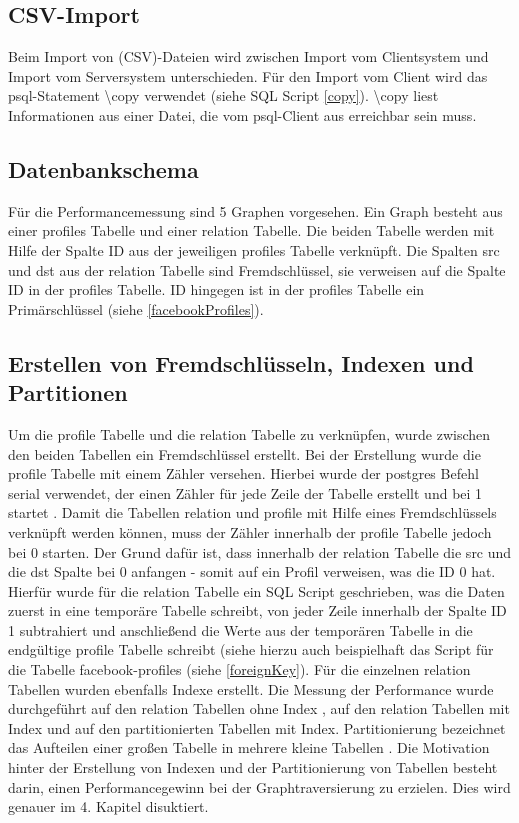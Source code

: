\subsection{CSV-Import}
Beim Import von (CSV)-Dateien wird zwischen Import vom Clientsystem und  Import vom Serversystem unterschieden.
Für den Import vom Client wird das psql-Statement \textbackslash copy verwendet (siehe SQL Script \ref{copy}).
\textbackslash copy liest Informationen aus einer Datei,
die vom psql-Client aus erreichbar sein muss. \cite{postgres2018}

\subsection{Datenbankschema}
Für die Performancemessung sind 5 Graphen vorgesehen. Ein Graph besteht aus einer profiles Tabelle und einer relation Tabelle. Die beiden Tabelle werden mit Hilfe der
Spalte ID aus der jeweiligen profiles Tabelle verknüpft. Die Spalten src und dst aus der relation Tabelle sind Fremdschlüssel, sie verweisen auf die Spalte ID in der
profiles Tabelle. ID hingegen ist in der profiles Tabelle ein Primärschlüssel (siehe \ref{facebookProfiles}).

\subsection{Erstellen von Fremdschlüsseln, Indexen und Partitionen}
Um die profile Tabelle und die relation Tabelle zu verknüpfen, wurde zwischen den beiden Tabellen ein Fremdschlüssel erstellt. Bei der Erstellung wurde die profile Tabelle
mit einem Zähler versehen. Hierbei wurde der postgres Befehl serial verwendet, der einen Zähler für jede Zeile der Tabelle erstellt und bei 1 startet . Damit die Tabellen
relation und profile mit Hilfe eines Fremdschlüssels verknüpft werden können, muss der Zähler innerhalb der profile Tabelle jedoch bei 0 starten. Der Grund dafür ist, dass
innerhalb der relation Tabelle die src und die dst Spalte bei 0 anfangen - somit auf ein Profil verweisen, was die ID 0 hat. Hierfür wurde für die relation Tabelle ein
SQL Script geschrieben, was die Daten zuerst in eine temporäre Tabelle schreibt, von jeder Zeile innerhalb der Spalte ID 1 subtrahiert und anschließend die Werte aus
der temporären Tabelle in die endgültige profile Tabelle schreibt (siehe hierzu auch beispielhaft das Script für die Tabelle facebook-profiles (siehe \ref{foreignKey}).
Für die einzelnen relation Tabellen wurden ebenfalls Indexe erstellt. Die Messung der Performance wurde durchgeführt auf
den relation Tabellen ohne Index , auf den relation Tabellen mit Index und auf den partitionierten Tabellen mit Index. Partitionierung bezeichnet das Aufteilen einer
großen Tabelle in mehrere kleine Tabellen \cite{postgrespartitioning} . Die Motivation hinter der Erstellung von Indexen und der Partitionierung von Tabellen besteht darin,
einen Performancegewinn bei der Graphtraversierung zu erzielen. Dies wird genauer im 4. Kapitel disuktiert.


